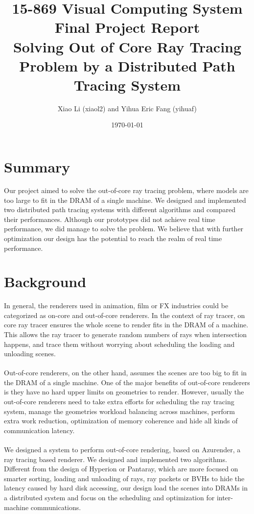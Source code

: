 \documentclass[a4paper, oneside, 10pt]{article}
\title{{\bf 15-869 Visual Computing System Final Project Report \\
 \large Solving Out of Core Ray Tracing Problem by a Distributed Path Tracing System}} %
\author{Xiao Li (xiaol2) and Yihua Eric Fang (yihuaf)}
\date{\today} %
\begin{document}
\maketitle
\newpage
\tableofcontents
\newpage


\section{Summary}
Our project aimed to solve the out-of-core ray tracing problem, where models are too large to fit in the DRAM of a single machine. We designed and implemented two distributed path tracing systems with different algorithms and compared their performances. Although our prototypes did not achieve real time performance, we did manage to solve the problem. We believe that with further optimization our design has the potential to reach the realm of real time performance.\\
\section{Background}
\paragraph{} In general, the renderers used in animation, film or FX industries could be categorized as on-core and out-of-core renderers.  In the context of ray tracer, on core ray tracer ensures the whole scene to render fits in the DRAM of a machine. This allows the ray tracer to generate random numbers of rays when intersection happens, and trace them without worrying about scheduling the loading and unloading scenes. 

\paragraph{} Out-of-core renderers, on the other hand, assumes the scenes are too big to fit in the DRAM of a single machine. One of the major benefits of out-of-core renderers is they have no hard upper limits on geometries to render. However, usually the out-of-core renderers need to take extra efforts for scheduling the ray tracing system, manage the geometries workload balancing across machines, perform extra work reduction, optimization of memory coherence and hide all kinds of communication latency. 

\paragraph{} We designed a system to perform out-of-core rendering, based on Azurender, a ray tracing based renderer. We designed and implemented two algorithms. Different from the design of Hyperion or Pantaray, which are more focused on smarter sorting, loading and unloading of rays, ray packets or BVHs to hide the latency caused by hard disk accessing, our design load the scenes into DRAMs in a distributed system and focus on the scheduling and optimization for inter-machine communications. 
\end{document}
